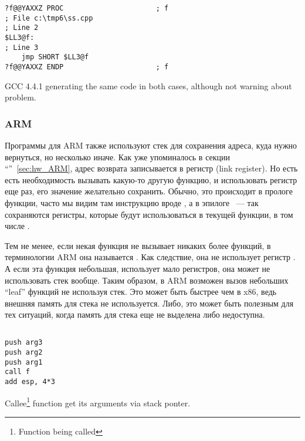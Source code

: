 \begin{lstlisting}
?f@@YAXXZ PROC						; f
; File c:\tmp6\ss.cpp
; Line 2
$LL3@f:
; Line 3
	jmp	SHORT $LL3@f
?f@@YAXXZ ENDP						; f
\end{lstlisting}

{GCC 4.4.1 generating the same code in both cases, although not warning about problem.}

\subsubsection{ARM}

Программы для ARM также используют стек для сохранения адреса, куда нужно вернуться, но несколько иначе.
Как уже упоминалось в секции ``\HelloWorldSectionName''~\ref{sec:hw_ARM}, адрес возврата записывается в регистр \LR 
(link register). Но есть есть необходимость вызывать какую-то другую функцию, и использовать регистр \LR еще
раз, его значение желательно сохранить. Обычно, это происходит в прологе функции, часто мы видим там инструкцию
вроде , а в эпилоге  ~--- так сохраняются регистры, которые будут
использоваться в текущей функции, в том числе \LR.

Тем не менее, если некая функция не вызывает никаких более функций, в терминологии ARM она называется 
. Как следствие, она не использует регистр \LR. 
А если эта функция небольшая, использует мало регистров, она может не использовать стек вообще. 
Таким образом, в ARM возможен вызов небольших ``leaf'' функций не используя стек. 
Это может быть быстрее чем в x86, ведь внешняя память для стека не используется. 
Либо, это может быть полезным для тех ситуаций, когда память для стека еще не выделена либо недоступна.

\subsection{}

\begin{lstlisting}
push arg3
push arg2
push arg1
call f
add esp, 4*3
\end{lstlisting}

{Callee{\footnote{Function being called}} function get its arguments via stack ponter.}

